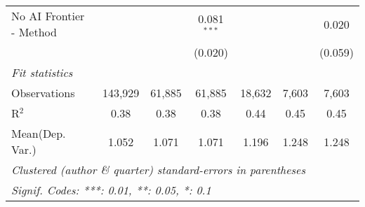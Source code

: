 \begin{tabular}{lcccccc}
   No AI Frontier - Method &              &               & 0.081$^{***}$ &         &              & 0.020\\   
                           &              &               & (0.020)       &         &              & (0.059)\\   
   \midrule
   \emph{Fit statistics}\\
   Observations            & 143,929      & 61,885        & 61,885        & 18,632  & 7,603        & 7,603\\  
   R$^2$                   & 0.38         & 0.38          & 0.38          & 0.44    & 0.45         & 0.45\\  
Mean(Dep. Var.) & 1.052 & 1.071 & 1.071 & 1.196 & 1.248 & 1.248 \\
   \midrule \midrule
   \multicolumn{7}{l}{\emph{Clustered (author \& quarter) standard-errors in parentheses}}\\
   \multicolumn{7}{l}{\emph{Signif. Codes: ***: 0.01, **: 0.05, *: 0.1}}\\
\end{tabular}
\par\endgroup
